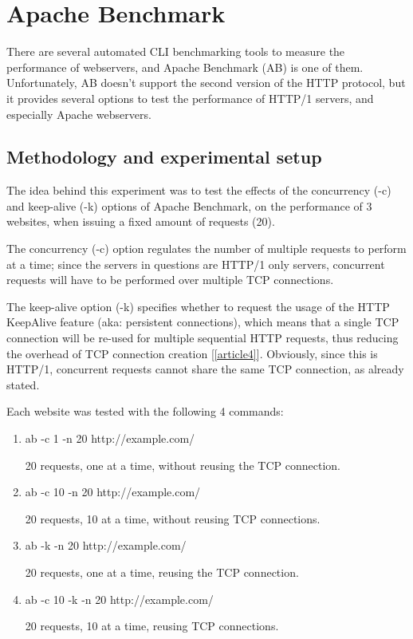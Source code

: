 \documentclass[a4paper,10pt]{article}
\begin{document}
\clearpage



\section{Apache Benchmark}

There are several automated CLI benchmarking tools to measure the performance of webservers, and Apache Benchmark (AB) is one of them. Unfortunately, AB doesn't support the second version of the HTTP protocol, but it provides several options to test the performance of HTTP/1 servers, and especially Apache webservers.

\subsection{Methodology and experimental setup}

The idea behind this experiment was to test the effects of the concurrency (-c) and keep-alive (-k) options of Apache Benchmark, on the performance of 3 websites, when issuing a fixed amount of requests (20). 

The concurrency (-c) option regulates the number of multiple requests to perform at a time; since the servers in questions are HTTP/1 only servers, concurrent requests will have to be performed over multiple TCP connections. 

The keep-alive option (-k) specifies whether to request the usage of the HTTP KeepAlive feature (aka: persistent connections), which means that a single TCP connection will be re-used for multiple sequential HTTP requests, thus reducing the overhead of TCP connection creation [\ref{article4}]. Obviously, since this is HTTP/1, concurrent requests cannot share the same TCP connection, as already stated.


Each website was tested with the following 4 commands:


\begin{enumerate}


\item ab -c 1 -n 20 http://example.com/

20 requests, one at a time, without reusing the TCP connection.

\item ab -c 10 -n 20 http://example.com/

20 requests, 10 at a time, without reusing TCP connections.

\item ab -k -n 20 http://example.com/

20 requests, one at a time, reusing the TCP connection.


\item ab -c 10 -k -n 20 http://example.com/

20 requests, 10 at a time, reusing TCP connections.


\end{enumerate}
\end{document}
